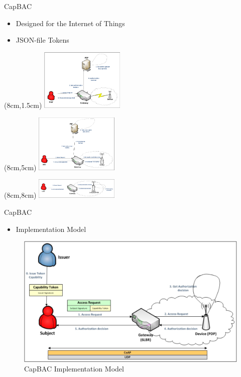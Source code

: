\documentclass[11pt]{beamer}
\begin{document}
\begin{frame}{CapBAC}
    \begin{itemize}
    \vfill
    \item Designed for the Internet of Things
    \vfill
    \item JSON-file Tokens
    \vfill
    \end{itemize}
    \begin{textblock*}{2.5cm}(8cm,1.5cm)
        \includegraphics[width=4cm]{img/centralized.png}
    \end{textblock*}
    \begin{textblock*}{2.5cm}(8cm,5cm)
        \includegraphics[width=4cm]{img/CAcentralized.png}
    \end{textblock*}
    \begin{textblock*}{2.5cm}(8cm,8cm)
        \includegraphics[width=4cm]{img/distributed.png}
    \end{textblock*}
\end{frame}


\begin{frame}{CapBAC}
    \vfill
    \begin{itemize}
    \item Implementation Model 
    \end{itemize}
        \vfill
    \begin{figure}
		  \includegraphics[scale=0.2]{img/capBac.png}
		  \caption{CapBAC Implementation Model}
    \end{figure}
    \vfill
\end{frame}
\end{document}
